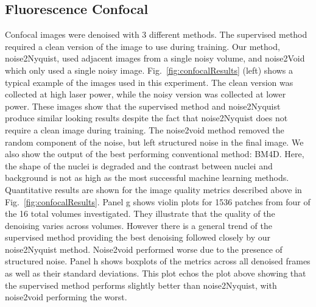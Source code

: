 \documentclass[journal,twoside,web]{ieeecolor}
\begin{document}
\subsection{Fluorescence Confocal}
Confocal images were denoised with 3 different methods. The supervised method required a clean version of the image to use during training. Our method, noise2Nyquist, used adjacent images from a single noisy volume, and noise2Void which only used a single noisy image. Fig.~\ref{fig:confocalResults} (left) shows a typical example of the images used in this experiment. The clean version was collected at high laser power, while the noisy version was collected at lower power. These images show that the supervised method and noise2Nyquist produce similar looking results despite the fact that noise2Nyquist does not require a clean image during training. The noise2void method removed the random component of the noise, but left structured noise in the final image. We also show the output of the best performing conventional method: BM4D. Here, the shape of the nuclei is degraded and the contrast between nuclei and background is not as high as the most successful machine learning methods. Quantitative results are shown for the image quality metrics described above in Fig.~\ref{fig:confocalResults}. Panel g shows violin plots for 1536 patches from four of the 16 total volumes investigated. They illustrate that the quality of the denoising varies across volumes. However there is a general trend of the supervised method providing the best denoising followed closely by our noise2Nyquist method. Noise2void performed worse due to the presence of structured noise. Panel h shows boxplots of the metrics across all denoised frames as well as their standard deviations. This plot echos the plot above showing that the supervised method performs slightly better than noise2Nyquist, with noise2void performing the worst.
\end{document}
